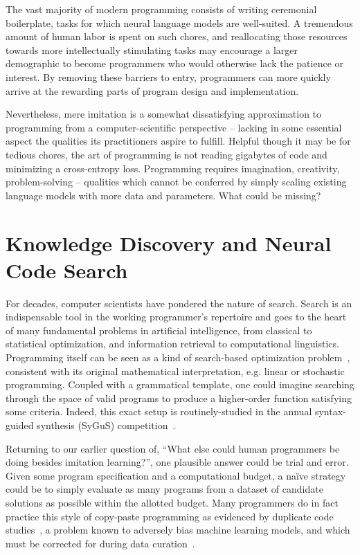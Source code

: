 \documentclass[10pt]{article}
\begin{document}
The vast majority of modern programming consists of writing ceremonial boilerplate, tasks for which neural language models are well-suited. A tremendous amount of human labor is spent on such chores, and reallocating those resources towards more intellectually stimulating tasks may encourage a larger demographic to become programmers who would otherwise lack the patience or interest. By removing these barriers to entry, programmers can more quickly arrive at the rewarding parts of program design and implementation.

Nevertheless, mere imitation is a somewhat dissatisfying approximation to programming from a computer-scientific perspective -- lacking in some essential aspect the qualities its practitioners aspire to fulfill. Helpful though it may be for tedious chores, the art of programming is not reading gigabytes of code and minimizing a cross-entropy loss. Programming requires imagination, creativity, problem-solving -- qualities which cannot be conferred by simply scaling existing language models with more data and parameters. What could be missing?

\section{Knowledge Discovery and Neural Code Search}

For decades, computer scientists have pondered the nature of search. Search is an indispensable tool in the working programmer's repertoire and goes to the heart of many fundamental problems in artificial intelligence, from classical to statistical optimization, and information retrieval to computational linguistics. Programming itself can be seen as a kind of search-based optimization problem~\cite{alur2018search}, consistent with its original mathematical interpretation, e.g. linear or stochastic programming. Coupled with a grammatical template, one could imagine searching through the space of valid programs to produce a higher-order function satisfying some criteria. Indeed, this exact setup is routinely-studied in the annual syntax-guided synthesis (SyGuS) competition~\cite{alur2016sygus}.

Returning to our earlier question of, ``What else could human programmers be doing besides imitation learning?'', one plausible answer could be trial and error. Given some program specification and a computational budget, a naïve strategy could be to simply evaluate as many programs from a dataset of candidate solutions as possible within the allotted budget. Many programmers do in fact practice this style of copy-paste programming as evidenced by duplicate code studies~\cite{lopes2017dejavu}, a problem known to adversely bias machine learning models, and which must be corrected for during data curation~\cite{allamanis2019adverse}.
\end{document}
